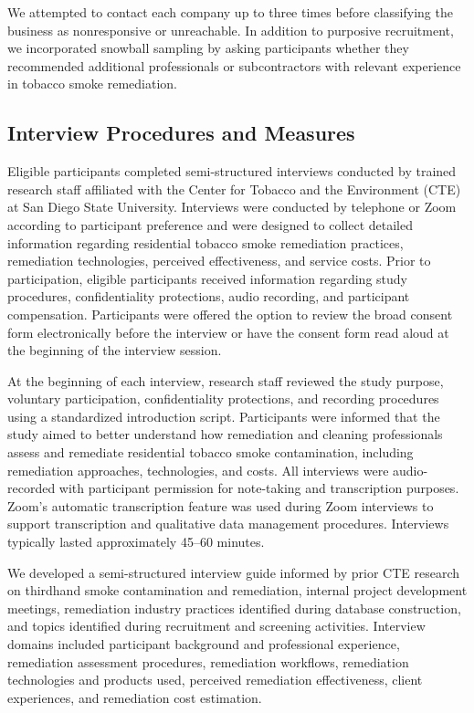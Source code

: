 \documentclass[stu]{apa7}
\begin{document}
We attempted to contact each company up to three times before classifying the business as nonresponsive or unreachable. In addition to purposive recruitment, we incorporated snowball sampling by asking participants whether they recommended additional professionals or subcontractors with relevant experience in tobacco smoke remediation.

\subsection{Interview Procedures and Measures}

Eligible participants completed semi-structured interviews conducted by trained research staff affiliated with the Center for Tobacco and the Environment (CTE) at San Diego State University. Interviews were conducted by telephone or Zoom according to participant preference and were designed to collect detailed information regarding residential tobacco smoke remediation practices, remediation technologies, perceived effectiveness, and service costs. Prior to participation, eligible participants received information regarding study procedures, confidentiality protections, audio recording, and participant compensation. Participants were offered the option to review the broad consent form electronically before the interview or have the consent form read aloud at the beginning of the interview session.

At the beginning of each interview, research staff reviewed the study purpose, voluntary participation, confidentiality protections, and recording procedures using a standardized introduction script. Participants were informed that the study aimed to better understand how remediation and cleaning professionals assess and remediate residential tobacco smoke contamination, including remediation approaches, technologies, and costs. All interviews were audio-recorded with participant permission for note-taking and transcription purposes. Zoom's automatic transcription feature was used during Zoom interviews to support transcription and qualitative data management procedures. Interviews typically lasted approximately 45--60 minutes.

We developed a semi-structured interview guide informed by prior CTE research on thirdhand smoke contamination and remediation, internal project development meetings, remediation industry practices identified during database construction, and topics identified during recruitment and screening activities. Interview domains included participant background and professional experience, remediation assessment procedures, remediation workflows, remediation technologies and products used, perceived remediation effectiveness, client experiences, and remediation cost estimation.
\end{document}
